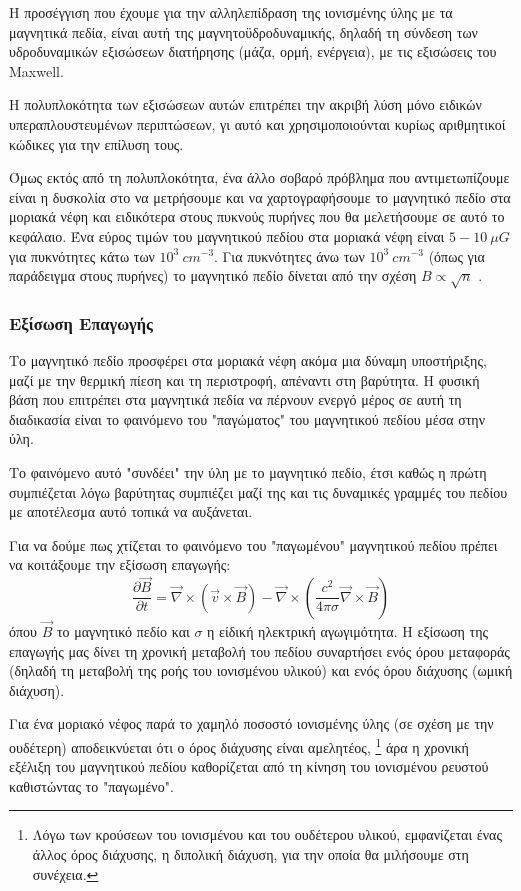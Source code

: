 \documentclass[a4paper,12pt]{memoir}
\newcommand{\pt}[1]{\frac{\partial #1}{\partial t}}
\newcommand{\vv}{\vec{v}}
\newcommand{\bb}{\vec{B}}
\newcommand{\nn}{\vec{\nabla}}
\begin{document}
Η προσέγγιση που έχουμε για την αλληλεπίδραση της ιονισμένης ύλης με τα μαγνητικά πεδία, είναι αυτή της μαγνητοϋδροδυναμικής, δηλαδή τη σύνδεση των υδροδυναμικών εξισώσεων διατήρησης (μάζα, ορμή, ενέργεια), με τις εξισώσεις του Maxwell.  

Η πολυπλοκότητα των εξισώσεων αυτών επιτρέπει την ακριβή λύση μόνο ειδικών υπεραπλουστευμένων περιπτώσεων, γι αυτό και χρησιμοποιούνται κυρίως αριθμητικοί κώδικες για την επίλυση τους.

Όμως εκτός από τη πολυπλοκότητα, ένα άλλο σοβαρό πρόβλημα που αντιμετωπίζουμε είναι η δυσκολία στο να μετρήσουμε και να χαρτογραφήσουμε το μαγνητικό πεδίο στα μοριακά νέφη και ειδικότερα στους πυκνούς πυρήνες που θα μελετήσουμε σε αυτό το κεφάλαιο. Ένα εύρος τιμών του μαγνητικού πεδίου στα μοριακά νέφη είναι $5-10\ \mu G$ για πυκνότητες κάτω των $10^3 \ cm^{-3}$. Για πυκνότητες άνω των $10^3 \ cm^{-3}$ (όπως για παράδειγμα στους πυρήνες) το μαγνητικό πεδίο δίνεται από την σχέση $B\propto \sqrt{n}$ \cite{crutcher_2007}.

\subsubsection{Εξίσωση Επαγωγής}
Το μαγνητικό πεδίο προσφέρει στα μοριακά νέφη ακόμα μια δύναμη υποστήριξης, μαζί με την θερμική πίεση και τη περιστροφή, απέναντι στη βαρύτητα. Η φυσική βάση που επιτρέπει στα μαγνητικά πεδία να πέρνουν ενεργό μέρος σε αυτή τη διαδικασία είναι το φαινόμενο του "παγώματος" του μαγνητικού πεδίου μέσα στην ύλη.

Το φαινόμενο αυτό "συνδέει" την ύλη με το μαγνητικό πεδίο, έτσι καθώς η πρώτη συμπιέζεται λόγω βαρύτητας συμπιέζει μαζί της και τις δυναμικές γραμμές του πεδίου με αποτέλεσμα αυτό τοπικά να αυξάνεται.

Για να δούμε πως χτίζεται το φαινόμενο του "παγωμένου" μαγνητικού πεδίου πρέπει να κοιτάξουμε την εξίσωση επαγωγής:
\begin{equation}
\pt{\bb} = \nn \times (\vv \times \bb) -\nn \times \left( \frac{c^2}{4 \pi \sigma} \nn \times \bb \right) 
\end{equation}
όπου  $\bb$ το μαγνητικό πεδίο και $\sigma$ η είδική ηλεκτρική αγωγιμότητα.
Η εξίσωση της επαγωγής μας δίνει τη χρονική μεταβολή του πεδίου συναρτήσει ενός όρου μεταφοράς (δηλαδή τη μεταβολή της ροής του ιονισμένου υλικού) και ενός όρου διάχυσης (ωμική διάχυση).

Για ένα μοριακό νέφος παρά το χαμηλό ποσοστό ιονισμένης ύλης (σε σχέση με την ουδέτερη) αποδεικνύεται ότι ο όρος διάχυσης είναι αμελητέος, \footnote{Λόγω των κρούσεων του ιονισμένου και του ουδέτερου υλικού, εμφανίζεται ένας άλλος όρος διάχυσης, η διπολική διάχυση, για την οποία θα μιλήσουμε στη συνέχεια.} άρα η χρονική εξέλιξη του μαγνητικού πεδίου καθορίζεται από τη κίνηση του ιονισμένου ρευστού καθιστώντας το "παγωμένο".
\end{document}
